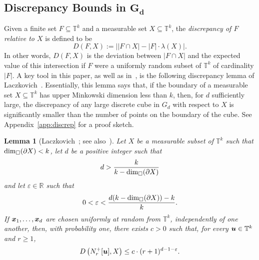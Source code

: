 \documentclass[12pt,a4paper]{amsart}
\numberwithin{equation}{section}
\newtheorem{lemma}[equation]{Lemma}
\theoremstyle{definition}
\begin{document}
\subsection{Discrepancy Bounds in $\boldsymbol{G_d}$}
\label{subsec:disc}

Given a finite set $F\subseteq \mathbb{T}^k$ and a measurable set $X\subseteq \mathbb{T}^k$, the \emph{discrepancy of $F$ relative to $X$} is defined to be
\begin{equation}\label{eq:discrepDef}D(F,X):= \big||F\cap X| - |F|\cdot\lambda(X)\big|.\end{equation}
In other words, $D(F,X)$ is the deviation between $|F\cap X|$ and the expected value of this intersection if $F$ were a uniformly random subset of $\mathbb{T}^k$ of cardinality $|F|$. A key tool in this paper, as well as in~\cite{GrabowskiMathePikhurko17,MarksUnger17}, is the following discrepancy lemma of Laczkovich~\cite{Laczkovich92b}. Essentially, this lemma says that, if the boundary of a measurable set $X\subseteq\mathbb{T}^k$ has upper Minkowski dimension less than $k$, then, for $d$ sufficiently large, the discrepancy of any large discrete cube in $G_d$ with respect to $X$ is significantly smaller than the number of points on the boundary of the cube. See Appendix~\ref{app:discrep} for a proof sketch. 

\begin{lemma}[Laczkovich~{\cite[Proof of Theorem~3]{Laczkovich92b}}; see also~{\cite[Lemma~6]{GrabowskiMathePikhurko17}}]
\label{lem:discrep}
Let $X$ be a measurable subset of $\mathbb{T}^k$ such that $\operatorname{dim}_\square(\partial X)<k$, let $d$ be a positive integer such that 
\[d>\frac{k}{k-\operatorname{dim}_\square(\partial X)}\]
and let $\varepsilon\in\mathbb{R}$ such that
\[0 <\varepsilon<\frac{d(k-\operatorname{dim}_\square(\partial X))-k}{k}.\]
If $\boldsymbol{x}_1,\dots,\boldsymbol{x}_d$ are chosen uniformly at random from $\mathbb{T}^k$, independently of one another, then, with probability one, there exists $c>0$ such that,  for every $\boldsymbol{u}\in\mathbb{T}^k$ and $r\geq1$,
\[D\left(N_{r}^+[\boldsymbol{u}],X\right) \leq c\cdot (r+1)^{d-1-\varepsilon}.\]
\end{lemma} 
\end{document}
